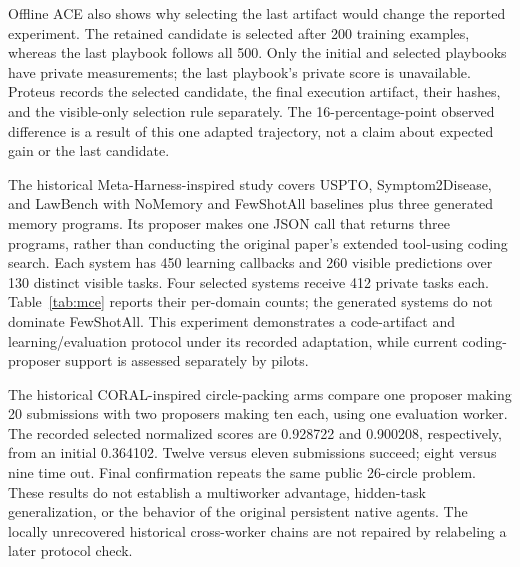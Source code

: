 

Offline ACE also shows why selecting the last artifact would change the reported experiment. The retained candidate is selected after 200 training examples, whereas the last playbook follows all 500. Only the initial and selected playbooks have private measurements; the last playbook's private score is unavailable. Proteus records the selected candidate, the final execution artifact, their hashes, and the visible-only selection rule separately. The 16-percentage-point observed difference is a result of this one adapted trajectory, not a claim about expected gain or the last candidate.

The historical Meta-Harness-inspired study covers USPTO, Symptom2Disease, and LawBench with NoMemory and FewShotAll baselines plus three generated memory programs. Its proposer makes one JSON call that returns three programs, rather than conducting the original paper's extended tool-using coding search. Each system has 450 learning callbacks and 260 visible predictions over 130 distinct visible tasks. Four selected systems receive 412 private tasks each. Table~\ref{tab:mce} reports their per-domain counts; the generated systems do not dominate FewShotAll. This experiment demonstrates a code-artifact and learning/evaluation protocol under its recorded adaptation, while current coding-proposer support is assessed separately by pilots.



The historical CORAL-inspired circle-packing arms compare one proposer making 20 submissions with two proposers making ten each, using one evaluation worker. The recorded selected normalized scores are 0.928722 and 0.900208, respectively, from an initial 0.364102. Twelve versus eleven submissions succeed; eight versus nine time out. Final confirmation repeats the same public 26-circle problem. These results do not establish a multiworker advantage, hidden-task generalization, or the behavior of the original persistent native agents. The locally unrecovered historical cross-worker chains are not repaired by relabeling a later protocol check.

